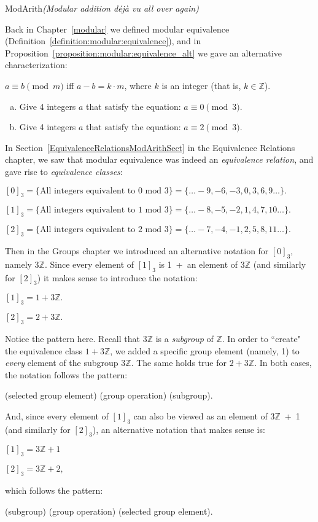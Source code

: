 \begin{example}{ModArith}\emph{(Modular addition d\'ej\`a vu all over again)}  

Back in Chapter~\ref{modular} we defined modular equivalence (Definition~\ref{definition:modular:equivalence}), and in Proposition~\ref{proposition:modular:equivalence_alt} we gave an alternative characterization:
\medskip

$a \equiv b \pmod{m}$ iff $a - b = k \cdot m$, where $k$ is an integer (that is, $k \in  {\mathbb Z}$). 
\medskip

\begin{exercise}{}
\begin{enumerate}[(a)]
\item
Give 4 integers $a$ that satisfy the equation: $a \equiv 0 \pmod{3}$.
\item
Give 4 integers $a$ that satisfy the equation: $a \equiv 2 \pmod{3}$.
\end{enumerate}
\end{exercise}

\noindent
In Section~\ref{EquivalenceRelationsModArithSect} in the Equivalence Relations chapter, we saw that modular equivalence was indeed an \emph{equivalence relation}, and  gave rise to \emph{equivalence classes}:
\medskip

$[0]_3  = \{\mbox{All integers equivalent to 0 mod 3}\} = \{ \ldots -9, -6, -3, 0, 3, 6, 9 \ldots \}.$

$[1]_3  = \{\mbox{All integers equivalent to 1 mod 3}\} = \{ \ldots -8, -5, -2, 1, 4, 7, 10 \ldots \}.$

$[2]_3  = \{\mbox{All integers equivalent to 2 mod 3}\} = \{ \ldots -7, -4, -1, 2, 5, 8, 11 \ldots \}.$
\medskip

\noindent
Then in the Groups chapter we introduced an alternative notation for $[0]_3$, namely $3{\mathbb Z}$. Since every element of  $[1]_3$ is 1~+~an element of $3{\mathbb Z}$ (and similarly for $[2]_3$)  it makes sense to introduce the notation:
\medskip

$[1]_3  = 1 + 3{\mathbb Z}.$

$[2]_3  = 2 + 3{\mathbb Z}.$
\medskip

\noindent
Notice the pattern here. Recall that $3{\mathbb Z}$ is a \emph{subgroup} of ${\mathbb Z}$. In order to ``create" the equivalence class $1 + 3{\mathbb Z}$, we added a specific group element (namely, 1) to \emph{every} element of the subgroup $3{\mathbb Z}$. The same holds true for $2 +  3{\mathbb Z}$. In both cases, the notation follows the pattern: 
\medskip

(selected group element) (group operation) (subgroup). 
\medskip

\noindent
And, since every element of  $[1]_3$ can also be viewed as an element of $3{\mathbb Z}$~+~1 (and similarly for $[2]_3$), an alternative notation that makes sense is:
\medskip

$[1]_3  =  3{\mathbb Z} + 1$

$[2]_3  = 3{\mathbb Z} + 2,$
\medskip

\noindent
which follows the pattern:
\medskip

(subgroup) (group operation) (selected group element).
\end{example}

